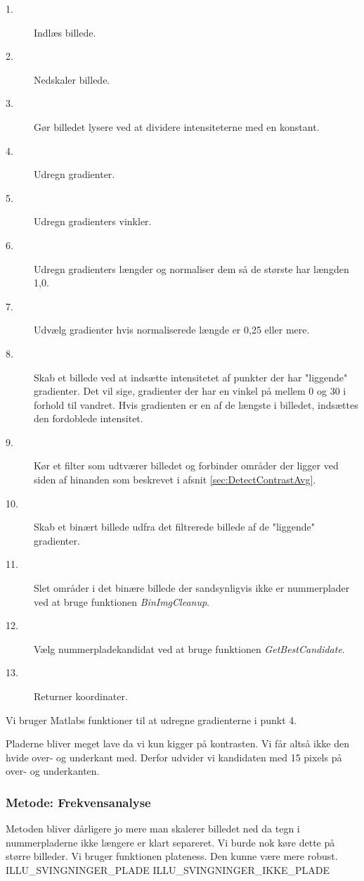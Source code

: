 \begin{description}
\item[1.] Indlæs billede.
\item[2.] Nedskaler billede.
\item[3.] Gør billedet lysere ved at dividere intensiteterne med en konstant.
\item[4.] Udregn gradienter.
\item[5.] Udregn gradienters vinkler.
\item[6.] Udregn gradienters længder og normaliser dem så de største har længden 1,0.
\item[7.] Udvælg gradienter hvis normaliserede længde er 0,25 eller mere.
\item[8.] Skab et billede ved at indsætte intensitetet af punkter der har "liggende" gradienter. Det vil sige, gradienter der har en vinkel på mellem 0 og 30 i forhold til vandret. Hvis gradienten er en af de længste i billedet, indsættes den fordoblede intensitet.
\item[9.] Kør et filter som udtværer billedet og forbinder områder der ligger ved siden af hinanden som beskrevet i afsnit \ref{sec:DetectContrastAvg}.
\item[10.] Skab et binært billede udfra det filtrerede billede af de "liggende" gradienter. 
\item[11.] Slet områder i det binære billede der sandsynligvis ikke er nummerplader ved at bruge funktionen \textit{BinImgCleanup}.
\item[12.] Vælg nummerpladekandidat ved at bruge funktionen \textit{GetBestCandidate}.
\item[13.] Returner koordinater.
\end{description}

Vi bruger Matlabs funktioner til at udregne gradienterne i punkt 4.


Pladerne bliver meget lave da vi kun kigger på kontrasten. Vi får altså ikke den hvide over- og underkant med. Derfor udvider vi kandidaten med 15 pixels på over- og underkanten. 

\subsubsection{Metode: Frekvensanalyse}
Metoden bliver dårligere jo mere man skalerer billedet ned da tegn i nummerpladerne ikke længere er klart separeret. Vi burde nok køre dette på større billeder.
Vi bruger funktionen plateness. Den kunne være mere robust.
ILLU\_SVINGNINGER\_PLADE ILLU\_SVINGNINGER\_IKKE\_PLADE


